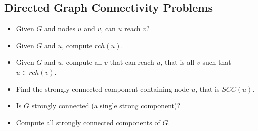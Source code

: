 \subsection{Directed Graph Connectivity Problems}
\begin{itemize}
    \item Given $G$ and nodes $u$ and $v$, can $u$ reach $v$?
    \item Given $G$ and $u$, compute $rch(u)$.
    \item Given $G$ and $u$, compute all $v$ that can reach $u$, that is all $v$ such that $u \in rch(v)$.
    \item Find the strongly connected component containing node $u$, that is $SCC(u)$.
    \item Is $G$ strongly connected (a single strong component)?
    \item Compute all strongly connected components of $G$.
\end{itemize}

